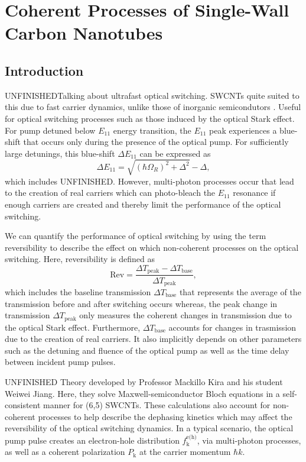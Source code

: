 \chapter{Coherent Processes of Single-Wall Carbon Nanotubes}

\section{Introduction}


{\color{red} UNFINISHED}Talking about ultrafast optical switching. SWCNTs quite suited to this due to fast carrier dynamics, unlike those of inorganic semicondutors \cite{maeda2006gigantic}. Useful for optical switching processes such as those induced by the optical Stark effect. For pump detuned below $E_{11}$ energy transition, the $E_{11}$ peak experiences a blue-shift that occurs only during the presence of the optical pump. For sufficiently large detunings, this blue-shift $\Delta E_{11}$ can be expressed as
%
\begin{equation}
		\Delta E_{11} = \sqrt{(\hbar \Omega_R)^2 + \Delta^2} - \Delta,
\end{equation}
%
which includes {\color{red} UNFINISHED}. However, multi-photon processes occur that lead to the creation of real carriers which can photo-bleach the $E_{11}$ resonance if enough carriers are created and thereby limit the performance of the optical switching.

We can quantify the performance of optical switching by using the term reversibility to describe the effect on which non-coherent processes on the optical switching. Here, reversibility is defined as
%
\begin{equation}
 	\text{Rev} = \dfrac{\Delta T_\text{peak} - \Delta T_\text{base}}{\Delta T_\text{peak}},
\end{equation}
%
which includes the baseline transmission $\Delta T_\text{base}$ that represents the average of the transmission before and after switching occurs whereas, the peak change in transmission $\Delta T_\text{peak}$ only measures the coherent changes in transmission due to the optical Stark effect. Furthermore, $\Delta T_\text{base}$ accounts for changes in trasmission due to the creation of real carriers. It also implicitly depends on other parameters such as the detuning and fluence of the optical pump as well as the time delay between incident pump pulses.

{\color{red} UNFINISHED} Theory developed by Professor Mackillo Kira and his student Weiwei Jiang. Here, they solve Maxwell-semiconductor Bloch equations \cite{kira2011semiconductor} in a self-consistent manner for (6,5) SWCNTs. These calculations also account for non-coherent processes to help describe the dephasing kinetics which may affect the reversibility of the optical switching dynamics. In a typical scenario, the optical pump pulse creates an electron-hole distribution $f_\text{k}^\text{e(h)}$, via multi-photon processes, as well as a coherent polarization $P_\text{k}$ at the carrier momentum $\hbar k$.

